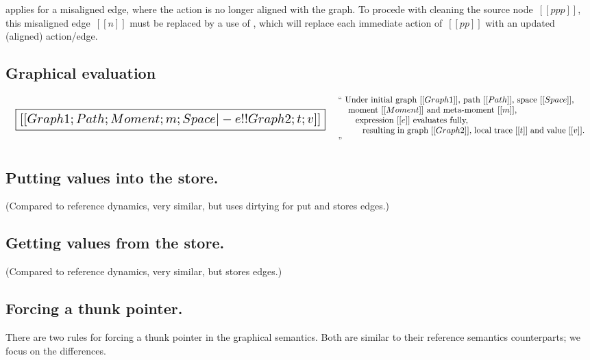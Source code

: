 \documentclass[11pt]{article}
\begin{document}
 applies for a misaligned edge, where the action
is no longer aligned with the graph.
%
To procede with cleaning the source node~$[[ppp]]$, this misaligned edge~$[[n]]$ must be
replaced by a use of , which will replace each
immediate action of~$[[pp]]$ with an updated (aligned) action/edge.

\subsection{Graphical evaluation}

\[
\begin{array}{lc}
  {\scalebox{1.5}{
  \boxed{[[Graph1; Path; Moment; m; Space |- e !! Graph2; t; v]]}}}
&
\begin{array}{p{4in}}
  ``
  Under initial graph~$[[Graph1]]$,
  path~$[[Path]]$,
  space~$[[Space]]$,\\
  \hspace{3mm}~moment~$[[Moment]]$ and meta-moment~$[[m]]$,\\
  \hspace{6mm}~expression~$[[e]]$ evaluates fully,\\
  \hspace{9mm}~resulting in graph~$[[Graph2]]$, local trace~$[[t]]$ and value~$[[v]]$.
  ''
\end{array}
\end{array}
\]

\subsection{Putting values into the store.}

(Compared to reference dynamics, very similar, but uses dirtying for put and stores edges.)

\subsection{Getting values from the store.}

(Compared to reference dynamics, very similar, but stores edges.)

\subsection{Forcing a thunk pointer.}

There are two rules for forcing a thunk pointer in the graphical semantics.
%
Both are similar to their reference semantics counterparts; we focus on the differences.
\end{document}
